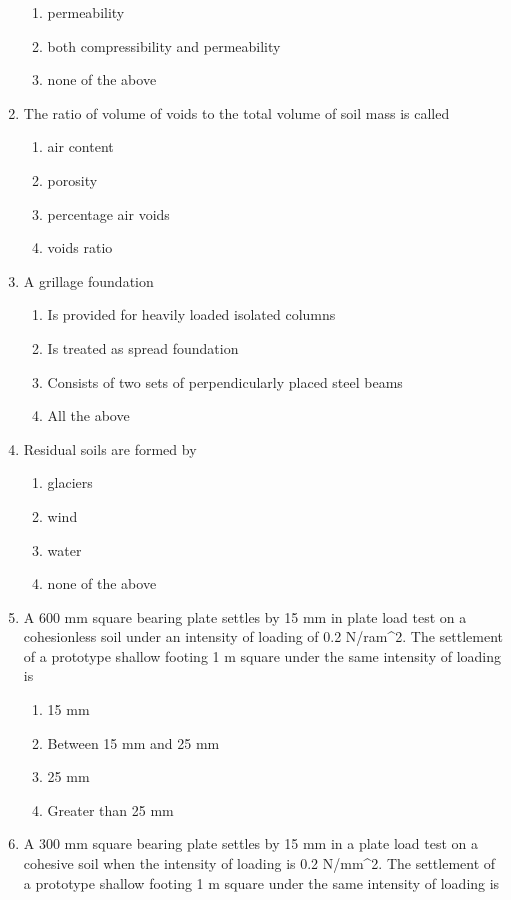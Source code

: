\documentclass[11pt,a4paper]{article}
\begin{document}
\begin{enumerate}
\begin{enumerate}[label=\Alph*.]
\item{permeability}
\item{both compressibility and permeability}
\item{none of the above}
\end{enumerate}
\item{The ratio of volume of voids to the total volume of soil mass is called}
\begin{enumerate}[label=\Alph*.]
\item{air content}
\item{porosity}
\item{percentage air voids}
\item{voids ratio}
\end{enumerate}
\item{A grillage foundation}
\begin{enumerate}[label=\Alph*.]
\item{Is provided for heavily loaded isolated columns}
\item{Is treated as spread foundation}
\item{Consists of two sets of perpendicularly placed steel beams}
\item{All the above}
\end{enumerate}
\item{Residual soils are formed by}
\begin{enumerate}[label=\Alph*.]
\item{glaciers}
\item{wind}
\item{water}
\item{none of the above}
\end{enumerate}
\item{A 600 mm square bearing plate settles by 15 mm in plate load test on a cohesionless soil under an intensity of loading of 0.2 N/ram\^{}2. The settlement of a prototype shallow footing 1 m square under the same intensity of loading is}
\begin{enumerate}[label=\Alph*.]
\item{15 mm}
\item{Between 15 mm and 25 mm}
\item{25 mm}
\item{Greater than 25 mm}
\end{enumerate}
\item{A 300 mm square bearing plate settles by 15 mm in a plate load test on a cohesive soil when the intensity of loading is 0.2 N/mm\^{}2. The settlement of a prototype shallow footing 1 m square under the same intensity of loading is
}
\end{enumerate}
\end{document}
